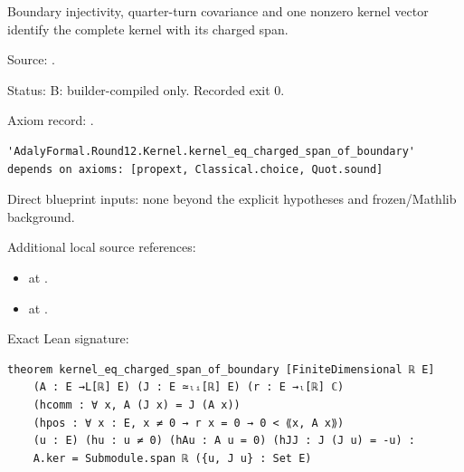 \begin{theorem}[bp-220]
\label{bp-220}
\uses{}
\leanok
Boundary injectivity, quarter-turn covariance and one nonzero kernel vector identify the complete kernel with its charged span.

\par Source: \texttt{}.
\par Status: B: builder-compiled only. Recorded exit 0.
\par Axiom record: \texttt{}.
\begin{verbatim}
'AdalyFormal.Round12.Kernel.kernel_eq_charged_span_of_boundary' depends on axioms: [propext, Classical.choice, Quot.sound]
\end{verbatim}
\par Direct blueprint inputs: none beyond the explicit hypotheses and frozen/Mathlib background.
\par Additional local source references:
\begin{itemize}
\item \texttt{} at \texttt{}.
\item \texttt{} at \texttt{}.
\end{itemize}
\par Exact Lean signature:
\begin{verbatim}
theorem kernel_eq_charged_span_of_boundary [FiniteDimensional ℝ E]
    (A : E →L[ℝ] E) (J : E ≃ₗᵢ[ℝ] E) (r : E →ₗ[ℝ] ℂ)
    (hcomm : ∀ x, A (J x) = J (A x))
    (hpos : ∀ x : E, x ≠ 0 → r x = 0 → 0 < ⟪x, A x⟫)
    (u : E) (hu : u ≠ 0) (hAu : A u = 0) (hJJ : J (J u) = -u) :
    A.ker = Submodule.span ℝ ({u, J u} : Set E)
\end{verbatim}
\end{theorem}

